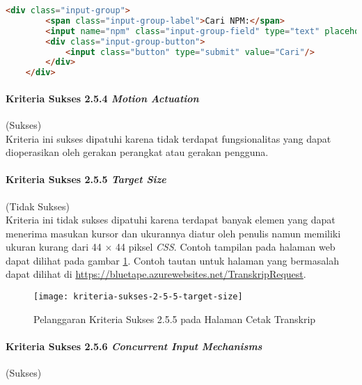 \begin{lstlisting}[frame=single, label={lst:2.5.3_label_dan_nama_pada_komponen_masukan}, language=HTML, caption=Pelanggaran Kriteria Sukses 2.5.3 pada Halaman Manajemen Cetak Transkrip]
    <div class="input-group">
        <span class="input-group-label">Cari NPM:</span>
        <input name="npm" class="input-group-field" type="text" placeholder="2013730013" maxlength="10" minlength="10"<?= $npmQuery === NULL ? '' : " value='$npmQuery'" ?>/>
        <div class="input-group-button">
            <input class="button" type="submit" value="Cari"/>
        </div>
    </div>
\end{lstlisting}

\paragraph{Kriteria Sukses 2.5.4 \textit{Motion Actuation}}
\label{par:kepatuhan_bluetape_kriteria_sukses_2.5.4}
(Sukses)\\

Kriteria ini sukses dipatuhi karena tidak terdapat fungsionalitas yang dapat dioperasikan oleh gerakan perangkat atau gerakan pengguna.

\paragraph{Kriteria Sukses 2.5.5 \textit{Target Size}}
\label{par:kepatuhan_bluetape_kriteria_sukses_2.5.5}
(Tidak Sukses)\\

Kriteria ini tidak sukses dipatuhi karena terdapat banyak elemen yang dapat menerima masukan kursor dan ukurannya diatur oleh penulis namun memiliki ukuran kurang dari 44 $\times$ 44 piksel \textit{CSS}. Contoh tampilan pada halaman web dapat dilihat pada gambar \ref{fig:2.5.5_target_size}. Contoh tautan untuk halaman yang bermasalah dapat dilihat di \url{https://bluetape.azurewebsites.net/TranskripRequest}.

\begin{figure}[H]
    \centering  
    \texttt{[image: kriteria-sukses-2-5-5-target-size]}  
    \caption[Pelanggaran Kriteria Sukses 2.5.5 pada Halaman Cetak Transkrip]{Pelanggaran Kriteria Sukses 2.5.5 pada Halaman Cetak Transkrip}
    \label{fig:2.5.5_target_size}  
\end{figure} 

\paragraph{Kriteria Sukses 2.5.6 \textit{Concurrent Input Mechanisms}}
\label{par:kepatuhan_bluetape_kriteria_sukses_2.5.6}
(Sukses)\\

